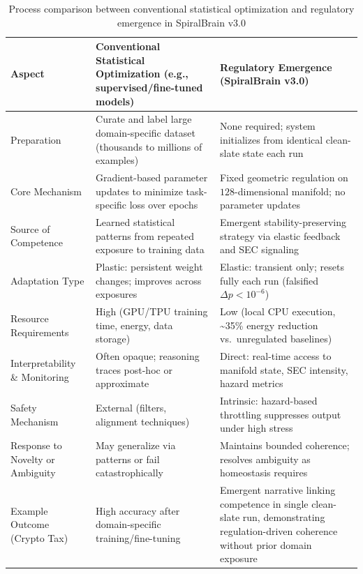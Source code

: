 \documentclass[12pt,a4paper]{report}
\begin{document}
\begin{table}[htbp]
\centering
\caption{Process comparison between conventional statistical optimization and regulatory emergence in SpiralBrain v3.0}
\small

\begin{tabular}{
    >{\raggedright\arraybackslash}p{3cm}
    >{\raggedright\arraybackslash}p{4cm}
    >{\raggedright\arraybackslash}p{6cm}
}
\toprule
\textbf{Aspect} &
\textbf{Conventional Statistical Optimization (e.g., supervised/fine-tuned models)} &
\textbf{Regulatory Emergence (SpiralBrain v3.0)} \\
\midrule

Preparation &
Curate and label large domain-specific dataset (thousands to millions of examples) &
None required; system initializes from identical clean-slate state each run \\
\midrule

Core Mechanism &
Gradient-based parameter updates to minimize task-specific loss over epochs &
Fixed geometric regulation on $128$-dimensional manifold; no parameter updates \\
\midrule

Source of Competence &
Learned statistical patterns from repeated exposure to training data &
Emergent stability-preserving strategy via elastic feedback and SEC signaling \\
\midrule

Adaptation Type &
Plastic: persistent weight changes; improves across exposures &
Elastic: transient only; resets fully each run (falsified $\Delta p < 10^{-6}$) \\
\midrule

Resource Requirements &
High (GPU/TPU training time, energy, data storage) &
Low (local CPU execution, \textasciitilde 35\% energy reduction vs.\ unregulated baselines) \\
\midrule

Interpretability \& Monitoring &
Often opaque; reasoning traces post-hoc or approximate &
Direct: real-time access to manifold state, SEC intensity, hazard metrics \\
\midrule

Safety Mechanism &
External (filters, alignment techniques) &
Intrinsic: hazard-based throttling suppresses output under high stress \\
\midrule

Response to Novelty or Ambiguity &
May generalize via patterns or fail catastrophically &
Maintains bounded coherence; resolves ambiguity as homeostasis requires \\
\midrule

Example Outcome (Crypto Tax) &
High accuracy after domain-specific training/fine-tuning &
Emergent narrative linking competence in single clean-slate run, demonstrating regulation-driven coherence without prior domain exposure \\
\bottomrule
\end{tabular}

\end{table}
\endgroup
\end{document}
